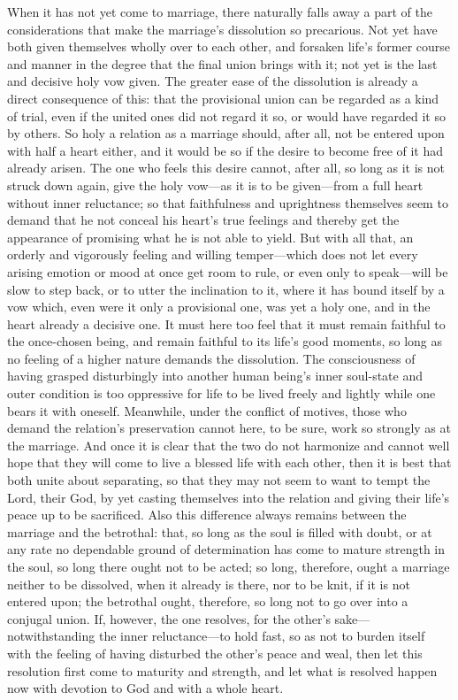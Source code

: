 \documentclass[12pt,a4paper]{book}
\begin{document}
When it has not yet come to marriage, there naturally falls away a part of
the considerations that make the marriage's dissolution so precarious. Not
yet have both given themselves wholly over to each other, and forsaken
life's former course and manner in the degree that the final union brings
with it; not yet is the last and decisive holy vow given. The greater ease
of the dissolution is already a direct consequence of this: that the
provisional union can be regarded as a kind of trial, even if the united
ones did not regard it so, or would have regarded it so by others. So holy
a relation as a marriage should, after all, not be entered upon with half a
heart either, and it would be so if the desire to become free of it had
already arisen. The one who feels this desire cannot, after all, so long as
it is not struck down again, give the holy vow---as it is to be given---from
a full heart without inner reluctance; so that faithfulness and uprightness
themselves seem to demand that he not conceal his heart's true feelings and
thereby get the appearance of promising what he is not able to yield. But
with all that, an orderly and vigorously feeling and willing temper---which
does not let every arising emotion or mood at once get room to rule, or
even only to speak---will be slow to step back, or to utter the inclination
to it, where it has bound itself by a vow which, even were it only a
provisional one, was yet a holy one, and in the heart already a decisive
one. It must here too feel that it must remain faithful to the once-chosen
being, and remain faithful to its life's good moments, so long as no
feeling of a higher nature demands the dissolution. The consciousness of
having grasped disturbingly into another human being's inner soul-state and
outer condition is too oppressive for life to be lived freely and lightly
while one bears it with oneself. Meanwhile, under the conflict of motives,
those who demand the relation's preservation cannot here, to be sure, work
so strongly as at the marriage. And once it is clear that the two do not
harmonize and cannot well hope that they will come to live a blessed life
with each other, then it is best that both unite about separating, so that
they may not seem to want to tempt the Lord, their God, by yet casting
themselves into the relation and giving their life's peace up to be
sacrificed. Also this difference always remains between the marriage and
the betrothal: that, so long as the soul is filled with doubt, or at any
rate no dependable ground of determination has come to mature strength in
the soul, so long there ought not to be acted; so long, therefore, ought a
marriage neither to be dissolved, when it already is there, nor to be knit,
if it is not entered upon; the betrothal ought, therefore, so long not to
go over into a conjugal union. If, however, the one resolves, for the
other's sake---notwithstanding the inner reluctance---to hold fast, so as
not to burden itself with the feeling of having disturbed the other's peace
and weal, then let this resolution first come to maturity and strength, and
let what is resolved happen now with devotion to God and with a whole
heart.
\end{document}
